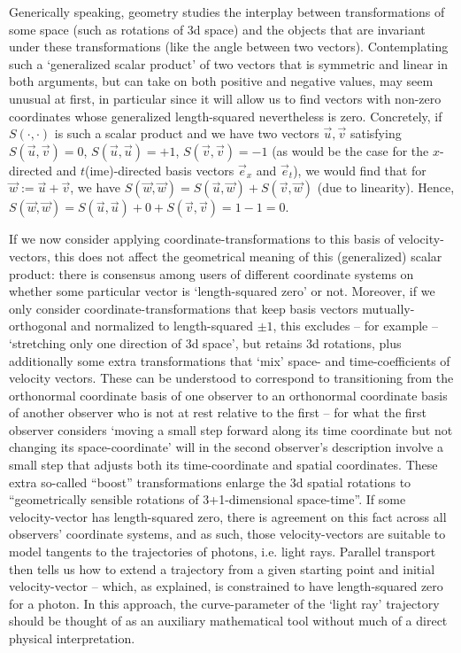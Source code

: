 \documentclass[twocolumn]{article}
\begin{document}
Generically speaking, geometry studies the interplay between
transformations of some space (such as rotations of 3d space) and the
objects that are invariant under these transformations (like the angle
between two vectors). Contemplating such a `generalized scalar
product' of two vectors that is symmetric and linear in both
arguments, but can take on both positive and negative values, may seem
unusual at first, in particular since it will allow us to find vectors
with non-zero coordinates whose generalized length-squared
nevertheless is zero. Concretely, if $S(\cdot, \cdot)$ is such a
scalar product and we have two vectors $\vec u, \vec v$ satisfying
$S(\vec u, \vec v)=0$, $S(\vec u, \vec u)=+1$, $S(\vec v, \vec v)=-1$
(as would be the case for the $x$-directed and $t$(ime)-directed basis
vectors $\vec e_x$ and $\vec e_t$), we would find that for
$\vec w:=\vec u+\vec v$, we have
$S(\vec w, \vec w)=S(\vec u,\vec w)+S(\vec v,\vec w)$ (due to linearity).
Hence, $S(\vec w, \vec w)=S(\vec u, \vec u)+0+S(\vec v,\vec v)=1-1=0$.

If we now consider applying coordinate-transformations to this basis
of velocity-vectors, this does not affect the geometrical meaning of
this (generalized) scalar product: there is consensus among users of
different coordinate systems on whether some particular vector is
`length-squared zero' or not. Moreover, if we only consider
coordinate-transformations that keep basis vectors mutually-orthogonal
and normalized to length-squared $\pm 1$, this excludes -- for example
-- `stretching only one direction of 3d space', but retains 3d
rotations, plus additionally some extra transformations that `mix'
space- and time-coefficients of velocity vectors. These can be
understood to correspond to transitioning from the orthonormal
coordinate basis of one observer to an orthonormal coordinate basis of
another observer who is not at rest relative to the first -- for what
the first observer considers `moving a small step forward along its
time coordinate but not changing its space-coordinate' will in the
second observer's description involve a small step that adjusts both
its time-coordinate and spatial coordinates. These extra so-called
``boost'' transformations enlarge the 3d spatial rotations to
``geometrically sensible rotations of 3+1-dimensional space-time''.
If some velocity-vector has length-squared zero, there is agreement on
this fact across all observers' coordinate systems, and as such, those
velocity-vectors are suitable to model tangents to the trajectories of
photons, i.e. light rays. Parallel transport then tells us how to
extend a trajectory from a given starting point and initial
velocity-vector -- which, as explained, is constrained to have
length-squared zero for a photon. In this approach, the
curve-parameter of the `light ray' trajectory should be thought of as
an auxiliary mathematical tool without much of a direct physical
interpretation.
\end{document}
